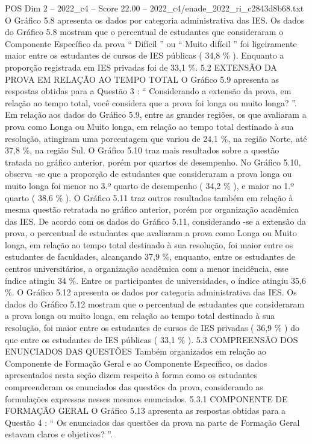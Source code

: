 \begin{textsample}{POS Dim 2 – 2022\_c4 – Score 22.00 – 2022\_c4/enade\_2022\_ri\_c2843d8b68.txt}
O Gráfico 5.8 apresenta os dados por categoria administrativa das IES.
Os dados do Gráfico 5.8 mostram que o percentual de estudantes que consideraram o Componente Específico da prova “ Difícil ” ou “ Muito difícil ” foi ligeiramente maior entre os estudantes de cursos de IES públicas ( 34,8 \% ).
Enquanto a proporção registrada em IES privadas foi de 33,1 \%. 5.2 EXTENSÃO DA PROVA EM RELAÇÃO AO TEMPO TOTAL O Gráfico 5.9 apresenta as respostas obtidas para a Questão 3 : “ Considerando a extensão da prova, em relação ao tempo total, você considera que a prova foi longa ou muito longa? ”.
Em relação aos dados do Gráfico 5.9, entre as grandes regiões, os que avaliaram a prova como Longa ou Muito longa, em relação ao tempo total destinado à sua resolução, atingiram uma porcentagem que variou de 24,1 \%, na região Norte, até 37,8 \%, na região Sul.
O Gráfico 5.10 traz mais resultados sobre a questão tratada no gráfico anterior, porém por quartos de desempenho.
No Gráfico 5.10, observa -se que a proporção de estudantes que consideraram a prova longa ou muito longa foi menor no 3.º quarto de desempenho ( 34,2 \% ), e maior no 1.º quarto ( 38,6 \% ).
O Gráfico 5.11 traz outros resultados também em relação à mesma questão retratada no gráfico anterior, porém por organização acadêmica das IES.
De acordo com os dados do Gráfico 5.11, considerando -se a extensão da prova, o percentual de estudantes que avaliaram a prova como Longa ou Muito longa, em relação ao tempo total destinado à sua resolução, foi maior entre os estudantes de faculdades, alcançando 37,9 \%, enquanto, entre os estudantes de centros universitários, a organização acadêmica com a menor incidência, esse índice atingiu 34 \%.
Entre os participantes de universidades, o índice atingiu 35,6 \%.
O Gráfico 5.12 apresenta os dados por categoria administrativa das IES.
Os dados do Gráfico 5.12 mostram que o percentual de estudantes que consideraram a prova longa ou muito longa, em relação ao tempo total destinado à sua resolução, foi maior entre os estudantes de cursos de IES privadas ( 36,9 \% ) do que entre os estudantes de IES públicas ( 33,1 \% ). 5.3 COMPREENSÃO DOS ENUNCIADOS DAS QUESTÕES Também organizados em relação ao Componente de Formação Geral e ao Componente Específico, os dados apresentados nesta seção dizem respeito à forma como os estudantes compreenderam os enunciados das questões da prova, considerando as formulações expressas nesses mesmos enunciados. 5.3.1 COMPONENTE DE FORMAÇÃO GERAL O Gráfico 5.13 apresenta as respostas obtidas para a Questão 4 : “ Os enunciados das questões da prova na parte de Formação Geral estavam claros e objetivos? ”.

\end{textsample}

